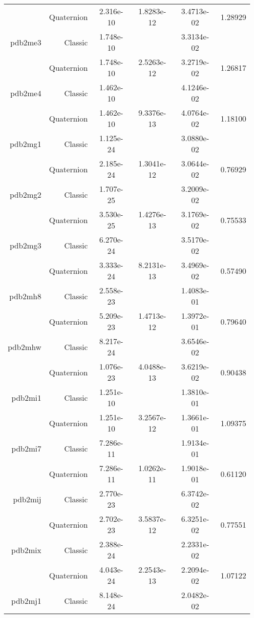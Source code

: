 \begin{xltabular}{\textwidth}{r|rS[table-format=1.3e+2]S[table-format=1.4e+2]S[table-format=1.4e+2]S[table-format=-1.5]}
& Quaternion & 2.316e-10 & 1.8283e-12 & 3.4713e-02 & 1.28929\\  \addlinespace
pdb2me3 & Classic & 1.748e-10 &  & 3.3134e-02 & \\
& Quaternion & 1.748e-10 & 2.5263e-12 & 3.2719e-02 & 1.26817\\  \addlinespace
pdb2me4 & Classic & 1.462e-10 &  & 4.1246e-02 & \\
& Quaternion & 1.462e-10 & 9.3376e-13 & 4.0764e-02 & 1.18100\\  \addlinespace
pdb2mg1 & Classic & 1.125e-24 &  & 3.0880e-02 & \\
& Quaternion & 2.185e-24 & 1.3041e-12 & 3.0644e-02 & 0.76929\\  \addlinespace
pdb2mg2 & Classic & 1.707e-25 &  & 3.2009e-02 & \\
& Quaternion & 3.530e-25 & 1.4276e-13 & 3.1769e-02 & 0.75533\\  \addlinespace
pdb2mg3 & Classic & 6.270e-24 &  & 3.5170e-02 & \\
& Quaternion & 3.333e-24 & 8.2131e-13 & 3.4969e-02 & 0.57490\\  \addlinespace
pdb2mh8 & Classic & 2.558e-23 &  & 1.4083e-01 & \\
& Quaternion & 5.209e-23 & 1.4713e-12 & 1.3972e-01 & 0.79640\\  \addlinespace
pdb2mhw & Classic & 8.217e-24 &  & 3.6546e-02 & \\
& Quaternion & 1.076e-23 & 4.0488e-13 & 3.6219e-02 & 0.90438\\  \addlinespace
pdb2mi1 & Classic & 1.251e-10 &  & 1.3810e-01 & \\
& Quaternion & 1.251e-10 & 3.2567e-12 & 1.3661e-01 & 1.09375\\  \addlinespace
pdb2mi7 & Classic & 7.286e-11 &  & 1.9134e-01 & \\
& Quaternion & 7.286e-11 & 1.0262e-11 & 1.9018e-01 & 0.61120\\  \addlinespace
pdb2mij & Classic & 2.770e-23 &  & 6.3742e-02 & \\
& Quaternion & 2.702e-23 & 3.5837e-12 & 6.3251e-02 & 0.77551\\  \addlinespace
pdb2mix & Classic & 2.388e-24 &  & 2.2331e-02 & \\
& Quaternion & 4.043e-24 & 2.2543e-13 & 2.2094e-02 & 1.07122\\  \addlinespace
pdb2mj1 & Classic & 8.148e-24 &  & 2.0482e-02 & \\

\end{xltabular}
